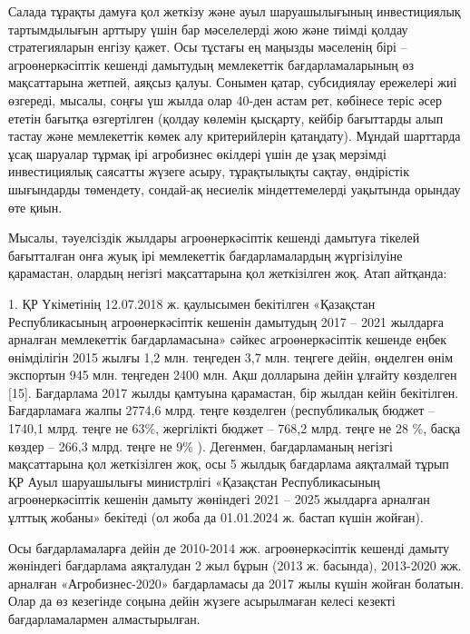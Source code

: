 \begin{multicols}{2}
Салада тұрақты дамуға қол жеткізу және ауыл шаруашылығының инвестициялық
тартымдылығын арттыру үшін бар мәселелерді жою және тиімді қолдау
стратегияларын енгізу қажет. Осы тұстағы ең маңызды мәселенің бірі --
агроөнеркәсіптік кешенді дамытудың мемлекеттік бағдарламаларының өз
мақсаттарына жетпей, аяқсыз қалуы. Сонымен қатар, субсидиялау ережелері
жиі өзгереді, мысалы, соңғы үш жылда олар 40-ден астам рет, көбінесе
теріс әсер ететін бағытқа өзгертілген (қолдау көлемін қысқарту, кейбір
бағыттарды алып тастау және мемлекеттік көмек алу критерийлерін
қатаңдату). Мұндай шарттарда ұсақ шаруалар тұрмақ ірі агробизнес
өкілдері үшін де ұзақ мерзімді инвестициялық саясатты жүзеге асыру,
тұрақтылықты сақтау, өндірістік шығындарды төмендету, сондай-ақ несиелік
міндеттемелерді уақытында орындау өте қиын.

Мысалы, тәуелсіздік жылдары агроөнеркәсіптік кешенді дамытуға тікелей
бағытталған онға жуық ірі мемлекеттік бағдарламалардың жүргізілуіне
қарамастан, олардың негізгі мақсаттарына қол жеткізілген жоқ. Атап
айтқанда:

1. ҚР Үкіметінің 12.07.2018 ж. қаулысымен бекітілген «Қазақстан
Республикасының агроөнеркәсіптік кешенін дамытудың 2017 -- 2021 жылдарға
арналған мемлекеттік бағдарламасына» сәйкес агроөнеркәсіптік кешенде
еңбек өнімділігін 2015 жылғы 1,2 млн. теңгеден 3,7 млн. теңгеге дейін,
өңделген өнім экспортын 945 млн. теңгеден 2400 млн. Ақш долларына дейін
ұлғайту көзделген {[}15{]}. Бағдарлама 2017 жылды қамтуына қарамастан,
бір жылдан кейін бекітілген. Бағдарламаға жалпы 2774,6 млрд. теңге
көзделген (республикалық бюджет -- 1740,1 млрд. теңге не 63\%,
жергілікті бюджет -- 768,2 млрд. теңге не 28 \%, басқа көздер -- 266,3
млрд. теңге не 9\% ). Дегенмен, бағдарламаның негізгі мақсаттарына қол
жеткізілген жоқ, осы 5 жылдық бағдарлама аяқталмай тұрып ҚР Ауыл
шаруашылығы министрлігі «Қазақстан Республикасының агроөнеркәсіптік
кешенін дамыту жөніндегі 2021 -- 2025 жылдарға арналған ұлттық жобаны»
бекітеді (ол жоба да 01.01.2024 ж. бастап күшін жойған).

Осы бағдарламаларға дейін де 2010-2014 жж. агроөнеркәсіптік кешенді
дамыту жөніндегі бағдарлама аяқталудан 2 жыл бұрын (2013 ж. басында),
2013-2020 жж. арналған «Агробизнес-2020» бағдарламасы да 2017 жылы күшін
жойған болатын. Олар да өз кезегінде соңына дейін жүзеге асырылмаған
келесі кезекті бағдарламалармен алмастырылған.


\end{multicols}
